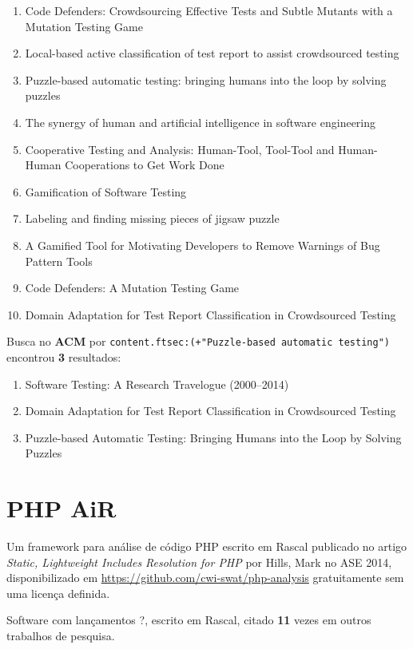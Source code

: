 \begin{enumerate}
\item Code Defenders: Crowdsourcing Effective Tests and Subtle Mutants with a Mutation Testing Game
\item Local-based active classification of test report to assist crowdsourced testing
\item Puzzle-based automatic testing: bringing humans into the loop by solving puzzles
\item The synergy of human and artificial intelligence in software engineering
\item Cooperative Testing and Analysis: Human-Tool, Tool-Tool and Human-Human Cooperations to Get Work Done
\item Gamification of Software Testing
\item Labeling and finding missing pieces of jigsaw puzzle
\item A Gamified Tool for Motivating Developers to Remove Warnings of Bug Pattern Tools
\item Code Defenders: A Mutation Testing Game
\item Domain Adaptation for Test Report Classification in Crowdsourced Testing
\end{enumerate}

Busca no {\bf ACM} por
\texttt{content.ftsec:(+"Puzzle-based automatic testing")}
encontrou {\bf 3}
resultados:

\begin{enumerate}
\item Software Testing: A Research Travelogue (2000--2014)
\item Domain Adaptation for Test Report Classification in Crowdsourced Testing
\item Puzzle-based Automatic Testing: Bringing Humans into the Loop by Solving Puzzles
\end{enumerate}

\section{PHP AiR}

Um framework para análise de código PHP escrito em Rascal
publicado no artigo {\it Static, Lightweight Includes Resolution for PHP}
por Hills, Mark
no ASE 2014,
disponibilizado em \url{https://github.com/cwi-swat/php-analysis}
gratuitamente
sem uma licença definida.

Software com lançamentos ?,
escrito em Rascal,
citado {\bf 11} vezes em outros trabalhos de pesquisa.

